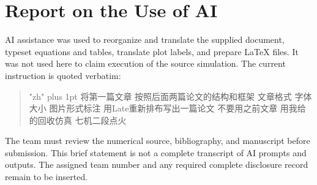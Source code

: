 \documentclass[11pt,a4paper]{article}
\begin{document}
\section*{Report on the Use of AI}
AI assistance was used to reorganize and translate the supplied document, typeset equations and tables, translate plot labels, and prepare LaTeX files. It was not used here to claim execution of the source simulation. The current instruction is quoted verbatim:
\begin{quote}
{\zhfont\small\XeTeXlinebreaklocale "zh"\XeTeXlinebreakskip=0pt plus 1pt
将第一篇文章 按照后面两篇论文的结构和框架 文章格式 字体大小 图片形式标注 用Late重新排布写出一篇论文 不要用之前文章 用我给的回收仿真 七机二段点火}
\end{quote}
The team must review the numerical source, bibliography, and manuscript before submission. This brief statement is not a complete transcript of AI prompts and outputs. The assigned team number and any required complete disclosure record remain to be inserted.
\end{document}
